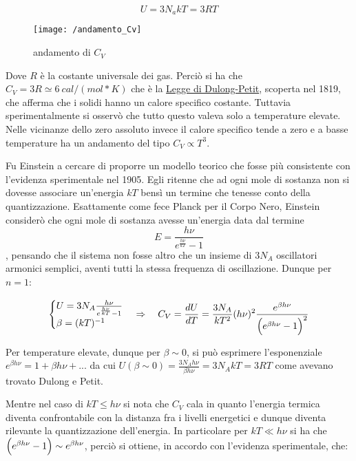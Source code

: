 \begin{equation}
U = 3 N_a k T = 3 R T
\end{equation}
\begin{figure}[h]
\centering
\texttt{[image: /andamento\_Cv]}
\caption{andamento di $C_V$}
\end{figure}
Dove $R$ è la costante universale dei gas. 
Perciò si ha che $C_V = 3 R \simeq \SI{6}{cal / (mol * K)}$ che è la \underline{Legge di Dulong-Petit}, scoperta nel 1819, che afferma che i solidi hanno un calore specifico costante. 
Tuttavia sperimentalmente si osservò che tutto questo valeva solo a temperature elevate.
Nelle vicinanze dello zero assoluto invece il calore specifico tende a zero e a basse temperature ha un andamento del tipo $C_V \propto T^3$.

Fu Einstein a cercare di proporre un modello teorico che fosse più consistente con l'evidenza sperimentale nel 1905.
Egli ritenne che ad ogni mole di sostanza non si dovesse associare un'energia $kT$ bensì un termine che tenesse conto della quantizzazione.
Esattamente come fece Planck per il Corpo Nero, Einstein considerò che ogni mole di sostanza avesse un'energia data dal termine
$$E = \frac{ h \nu}{e^{ \frac{ h\nu}{k T } } - 1 }$$, 
pensando che il sistema non fosse altro che un insieme di $3 N_A$ oscillatori armonici semplici, aventi tutti la stessa frequenza di oscillazione.
Dunque per $n=1$:

\begin{equation}
\begin{cases}
	U = 3 N_A \frac{ h \nu}{e^{ \frac{ h \nu}{ k T} } - 1 } \\
	\beta = (k T)^{ -1 }
\end{cases}
\Rightarrow \quad C_V = \frac{ dU}{dT } = \frac{ 3 N_A}{k T^2 } (h \nu)^2 \frac{ e^{ \beta h \nu }}{\Bigl(  e^{ \beta h \nu } - 1   \Bigr)^2}
\end{equation}

Per temperature elevate, dunque per $\beta \sim 0$, si può esprimere l'esponenziale $e^{ \beta h \nu } = 1 + \beta h \nu + ...$
da cui $U(\beta \sim 0) = \frac{ 3 N_A h \nu}{\beta h \nu } = 3 N_A k T = 3 R T$ come avevano trovato Dulong e Petit.

Mentre nel caso di $k T \leq h \nu$ si nota che $C_V$ cala in quanto l'energia termica diventa confrontabile con la distanza fra i livelli energetici e dunque diventa rilevante la quantizzazione dell'energia.
In particolare per $k T \ll h \nu$ si ha che $\Bigl(  e^{ \beta h \nu } - 1  \Bigr) \sim e^{ \beta h \nu }$, perciò si ottiene, in accordo con l'evidenza sperimentale, che:

